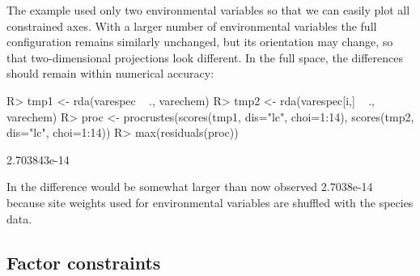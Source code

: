 \documentclass[article,nojss]{jss}
\begin{document}
The example used only two environmental variables so that we can
easily plot all constrained axes.  With a larger number of
environmental variables the full configuration remains similarly
unchanged, but its orientation may change, so that two-dimensional
projections look different.  In the full space, the differences should
remain within numerical accuracy:
\begin{Schunk}
\begin{Sinput}
R> tmp1 <- rda(varespec ~ ., varechem)
R> tmp2 <- rda(varespec[i,] ~ ., varechem)
R> proc <- procrustes(scores(tmp1, dis="lc", choi=1:14), scores(tmp2, dis="lc", choi=1:14))
R> max(residuals(proc))
\end{Sinput}
\begin{Soutput}
[1] 2.703843e-14
\end{Soutput}
\end{Schunk}
In  the difference would be somewhat larger than now
observed 2.7038e-14 because site
weights used for environmental variables are shuffled with the species
data.

\subsection{Factor constraints}
\end{document}
